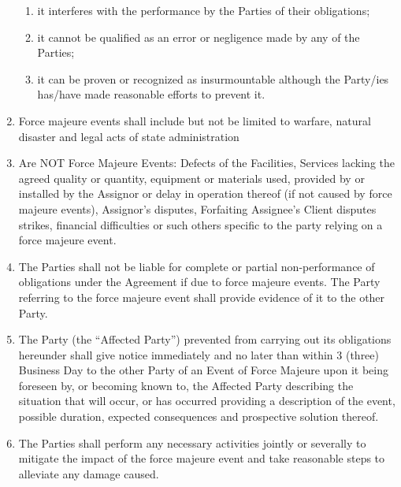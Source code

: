 \documentclass[a4paper]{article}
\begin{document}
\begin{multicols}{2}
\begin{enumerate}
\begin{enumerate}
    \item{it interferes with the performance by the Parties of their
        obligations;}

    \item{it cannot be qualified as an error or negligence made by any
        of the Parties; }

    \item{it can be proven or recognized as insurmountable although
        the Party/ies has/have made reasonable efforts to prevent
        it.}
    \end{enumerate}

  \item{Force majeure events shall include but not be limited to
      warfare, natural disaster and legal acts of state
      administration}

  \item{Are NOT Force Majeure Events: Defects of the Facilities,
      Services lacking the agreed quality or quantity, equipment or
      materials used, provided by or installed by the Assignor or
      delay in operation thereof (if not caused by force majeure
      events), Assignor's disputes, Forfaiting Assignee’s Client
      disputes strikes, financial difficulties or such others specific
      to the party relying on a force majeure event.}

  \item{The Parties shall not be liable for complete or partial
      non{-}performance of obligations under the Agreement if due to
      force majeure events. The Party referring to the force majeure
      event shall provide evidence of it to the other Party.}

  \item{The Party (the “Affected Party”) prevented from carrying out
      its obligations hereunder shall give notice immediately and no
      later than within 3 (three) Business Day to the other Party of
      an Event of Force Majeure upon it being foreseen by, or becoming
      known to, the Affected Party describing the situation that will
      occur, or has occurred providing a description of the event,
      possible duration, expected consequences and prospective
      solution thereof.}

  \item{The Parties shall perform any necessary activities jointly or
      severally to mitigate the impact of the force majeure event and
      take reasonable steps to alleviate any damage caused. }


\end{enumerate}
\end{multicols}
\end{document}
